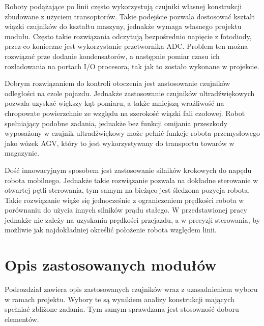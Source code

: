 Roboty podążające po linii często wykorzystują czujniki własnej konstrukcji zbudowane z użyciem transoptorów. Takie podejście pozwala dostosować kształt wiązki czujników do kształtu maszyny, jednakże wymaga własnego projektu modułu. Często takie rozwiązania odczytują bezpośrednio napięcie z fotodiody, przez co konieczne jest wykorzystanie przetwornika ADC.\cite{line_czujnik} Problem ten można rozwiązać prze dodanie kondensatorów, a następnie pomiar czasu ich rozładowania na portach I/O procesora, tak jak to zostało wykonane w projekcie. 

Dobrym rozwiązaniem do kontroli otoczenia jest zastosowanie czujników odległości na czole pojazdu. \cite{line_sharp} Jednakże zastosowanie czujników ultradźwiękowych pozwala uzyskać większy kąt pomiaru, a także mniejszą wrażliwość na chropowate powierzchnie ze względu na szerokość wiązki fali czołowej. Robot spełniający podobne zadania, jednakże bez funkcji omijania przeszkody wyposażony w czujnik ultradźwiękowy może pełnić funkcje robota przemysłowego jako wózek AGV, który to jest wykorzystywany do transportu towarów w magazynie. \cite{AGV}

Dość innowacyjnym sposobem jest zastosowanie silników krokowych do napędu robota mobilnego. Jednakże takie rozwiązanie pozwala na dokładne sterowanie w otwartej pętli sterowania, tym samym na bieżąco jest śledzona pozycja robota.\cite{kurosz} Takie rozwiązanie wiąże się jednocześnie z ograniczeniem prędkości robota w porównaniu do użycia innych silników prądu stałego.\cite{Tadeo} W przedstawionej pracy jednakże nie zależy na uzyskaniu prędkości przejazdu, a w precyzji sterowania, by możliwie jak najdokładniej określić położenie robota względem linii.

\section{Opis zastosowanych modułów}
Podrozdział zawiera opis zastosowanych czujników wraz z uzasadnieniem wyboru w ramach projektu. Wybory te są wynikiem analizy konstrukcji mających spełniać zbliżone zadania. Tym samym sprawdzana jest stosowność doboru elementów.
